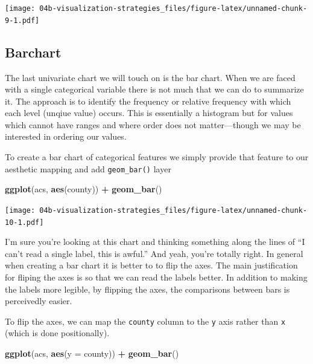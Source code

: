 \documentclass[
]{book}
\newenvironment{Shaded}{\begin{snugshade}}{\end{snugshade}}
\newcommand{\DataTypeTok}[1]{\textcolor[rgb]{0.13,0.29,0.53}{#1}}
\newcommand{\KeywordTok}[1]{\textcolor[rgb]{0.13,0.29,0.53}{\textbf{#1}}}
\newcommand{\NormalTok}[1]{#1}
\newcommand{\OperatorTok}[1]{\textcolor[rgb]{0.81,0.36,0.00}{\textbf{#1}}}
\newcommand{\StringTok}[1]{\textcolor[rgb]{0.31,0.60,0.02}{#1}}
\begin{document}
\texttt{[image: 04b-visualization-strategies\_files/figure-latex/unnamed-chunk-9-1.pdf]}

\hypertarget{barchart}{%
\subsection{Barchart}\label{barchart}}

The last univariate chart we will touch on is the bar chart. When we are faced with a single categorical variable there is not much that we can do to summarize it. The approach is to identify the frequency or relative frequency with which each level (unqiue value) occurs. This is essentially a histogram but for values which cannot have ranges and where order does not matter---though we may be interested in ordering our values.

To create a bar chart of categorical features we simply provide that feature to our aesthetic mapping and add \texttt{geom\_bar()} layer

\begin{Shaded}
\begin{Highlighting}[]
\KeywordTok{ggplot}\NormalTok{(acs, }\KeywordTok{aes}\NormalTok{(county)) }\OperatorTok{+}
\StringTok{  }\KeywordTok{geom\_bar}\NormalTok{()}
\end{Highlighting}
\end{Shaded}

\texttt{[image: 04b-visualization-strategies\_files/figure-latex/unnamed-chunk-10-1.pdf]}

I'm sure you're looking at this chart and thinking something along the lines of ``I can't read a single label, this is awful.'' And yeah, you're totally right. In general when creating a bar chart it is better to to flip the axes. The main justification for fliping the axes is so that we can read the labels better. In addition to making the labels more legible, by flipping the axes, the comparisons between bars is perceivedly easier.

To flip the axes, we can map the \texttt{county} column to the \texttt{y} axis rather than \texttt{x} (which is done positionally).

\begin{Shaded}
\begin{Highlighting}[]
\KeywordTok{ggplot}\NormalTok{(acs, }\KeywordTok{aes}\NormalTok{(}\DataTypeTok{y =}\NormalTok{ county)) }\OperatorTok{+}
\StringTok{  }\KeywordTok{geom\_bar}\NormalTok{()}
\end{Highlighting}
\end{Shaded}
\end{document}
